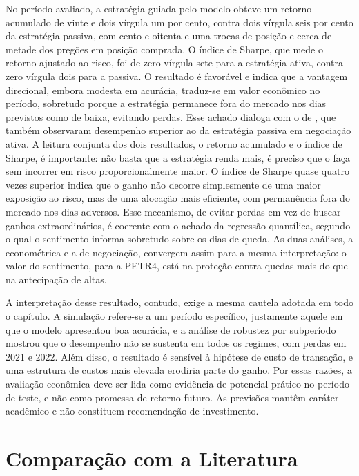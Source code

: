 No período avaliado, a estratégia guiada pelo modelo obteve um retorno acumulado de vinte e dois vírgula um por cento, contra dois vírgula seis por cento da estratégia passiva, com cento e oitenta e uma trocas de posição e cerca de metade dos pregões em posição comprada. O índice de Sharpe, que mede o retorno ajustado ao risco, foi de zero vírgula sete para a estratégia ativa, contra zero vírgula dois para a passiva. O resultado é favorável e indica que a vantagem direcional, embora modesta em acurácia, traduz-se em valor econômico no período, sobretudo porque a estratégia permanece fora do mercado nos dias previstos como de baixa, evitando perdas. Esse achado dialoga com o de , que também observaram desempenho superior ao da estratégia passiva em negociação ativa. A leitura conjunta dos dois resultados, o retorno acumulado e o índice de Sharpe, é importante: não basta que a estratégia renda mais, é preciso que o faça sem incorrer em risco proporcionalmente maior. O índice de Sharpe quase quatro vezes superior indica que o ganho não decorre simplesmente de uma maior exposição ao risco, mas de uma alocação mais eficiente, com permanência fora do mercado nos dias adversos. Esse mecanismo, de evitar perdas em vez de buscar ganhos extraordinários, é coerente com o achado da regressão quantílica, segundo o qual o sentimento informa sobretudo sobre os dias de queda. As duas análises, a econométrica e a de negociação, convergem assim para a mesma interpretação: o valor do sentimento, para a PETR4, está na proteção contra quedas mais do que na antecipação de altas.

A interpretação desse resultado, contudo, exige a mesma cautela adotada em todo o capítulo. A simulação refere-se a um período específico, justamente aquele em que o modelo apresentou boa acurácia, e a análise de robustez por subperíodo mostrou que o desempenho não se sustenta em todos os regimes, com perdas em 2021 e 2022. Além disso, o resultado é sensível à hipótese de custo de transação, e uma estrutura de custos mais elevada erodiria parte do ganho. Por essas razões, a avaliação econômica deve ser lida como evidência de potencial prático no período de teste, e não como promessa de retorno futuro. As previsões mantêm caráter acadêmico e não constituem recomendação de investimento.

\section{Comparação com a Literatura}

